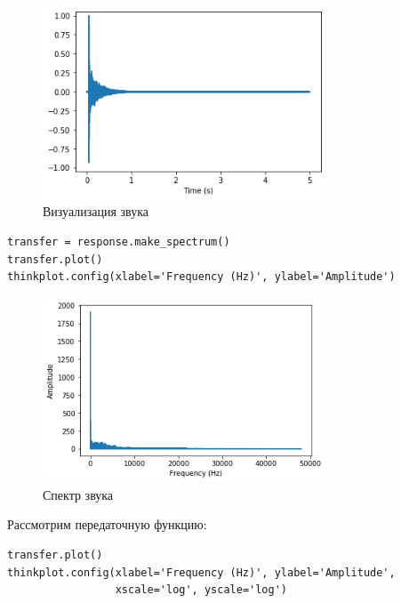 \documentclass[a4paper,12pt]{report}
\begin{document}
\begin{figure}[H]
        \centering
        \includegraphics[width=0.75\textwidth]{9.png}
        \caption{Визуализация звука}
        \label{9}
\end{figure}


\begin{lstlisting}[caption=Спектр звука]
transfer = response.make_spectrum()
transfer.plot()
thinkplot.config(xlabel='Frequency (Hz)', ylabel='Amplitude')
\end{lstlisting}

\begin{figure}[H]
        \centering
        \includegraphics[width=0.75\textwidth]{10.png}
        \caption{Спектр звука}
        \label{10}
\end{figure}

Рассмотрим передаточную функцию:

\begin{lstlisting}[caption=Визуализация звука]
transfer.plot()
thinkplot.config(xlabel='Frequency (Hz)', ylabel='Amplitude',
                 xscale='log', yscale='log')
\end{lstlisting}
\end{document}
